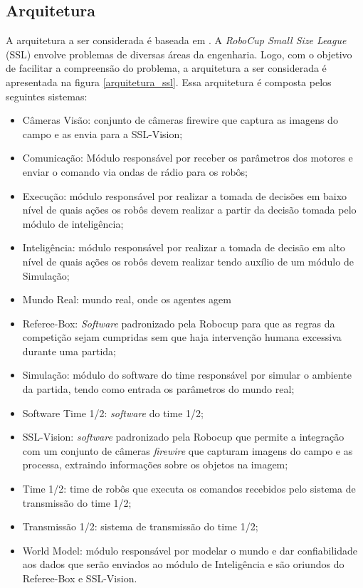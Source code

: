 \subsection{Arquitetura}

A arquitetura a ser considerada é baseada em \cite{felixnavarro}.
A \textit{RoboCup Small Size League} (SSL) envolve problemas de diversas áreas
da engenharia. Logo, com o objetivo de facilitar a compreensão do
problema, a arquitetura a ser considerada é apresentada na figura
\ref{arquitetura_ssl}. Essa arquitetura é composta pelos seguintes
sistemas:

\begin{itemize}
  \item Câmeras Visão: conjunto de câmeras firewire que captura as imagens do
        campo e as envia para a SSL-Vision;
  \item Comunicação: Módulo responsável por receber os parâmetros
        dos motores e enviar o comando via ondas de rádio para os
        robôs;
  \item Execução: módulo responsável por realizar a tomada de decisões
        em baixo nível de quais ações os robôs devem realizar a partir
        da decisão tomada pelo módulo de inteligência;
  \item Inteligência: módulo responsável por realizar a tomada de
        decisão em alto nível de quais ações os robôs devem realizar
        tendo auxílio de um módulo de Simulação;
  \item Mundo Real: mundo real, onde os agentes agem
  \item Referee-Box: \textit{Software} padronizado pela Robocup para que as
        regras da competição sejam cumpridas sem que haja intervenção
        humana excessiva durante uma partida;
  \item Simulação: módulo do software do time responsável por simular
        o ambiente da partida, tendo como entrada os parâmetros do mundo
        real;
  \item Software Time 1/2: \textit{software} do time 1/2;
  \item SSL-Vision: \textit{software} padronizado pela Robocup que permite a
        integração com um conjunto de câmeras \textit{firewire} que capturam
        imagens do campo e as processa, extraindo informações sobre os objetos na
        imagem;
  \item Time 1/2: time de robôs que executa os comandos recebidos pelo
        sistema de transmissão do time 1/2;
  \item Transmissão 1/2: sistema de transmissão do time 1/2;
  \item World Model: módulo responsável por modelar o mundo e dar
        confiabilidade aos dados que serão enviados ao módulo de
        Inteligência e são oriundos do Referee-Box e SSL-Vision.
\end{itemize}

